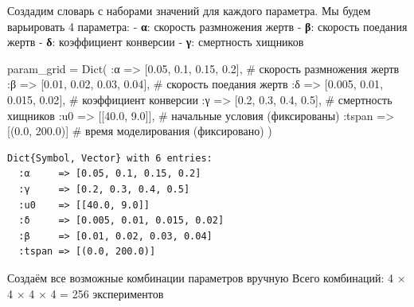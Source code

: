 \documentclass[
  12pt,
  a4paper,
  DIV=11,
  numbers=noendperiod]{scrreprt}
\newenvironment{Shaded}{\begin{snugshade}}{\end{snugshade}}
\newcommand{\CommentTok}[1]{\textcolor[rgb]{0.37,0.37,0.37}{#1}}
\newcommand{\FloatTok}[1]{\textcolor[rgb]{0.68,0.00,0.00}{#1}}
\newcommand{\FunctionTok}[1]{\textcolor[rgb]{0.28,0.35,0.67}{#1}}
\newcommand{\NormalTok}[1]{\textcolor[rgb]{0.00,0.23,0.31}{#1}}
\newcommand{\OperatorTok}[1]{\textcolor[rgb]{0.37,0.37,0.37}{#1}}
\begin{document}
Создадим словарь с наборами значений для каждого параметра. Мы будем
варьировать 4 параметра: - \textbf{α}: скорость размножения жертв -
\textbf{β}: скорость поедания жертв - \textbf{δ}: коэффициент конверсии
- \textbf{γ}: смертность хищников

\begin{Shaded}
\begin{Highlighting}[]
\NormalTok{param\_grid }\OperatorTok{=} \FunctionTok{Dict}\NormalTok{(}
    \OperatorTok{:}\NormalTok{α }\OperatorTok{=\textgreater{}}\NormalTok{ [}\FloatTok{0.05}\NormalTok{, }\FloatTok{0.1}\NormalTok{, }\FloatTok{0.15}\NormalTok{, }\FloatTok{0.2}\NormalTok{],        }\CommentTok{\# скорость размножения жертв}
    \OperatorTok{:}\NormalTok{β }\OperatorTok{=\textgreater{}}\NormalTok{ [}\FloatTok{0.01}\NormalTok{, }\FloatTok{0.02}\NormalTok{, }\FloatTok{0.03}\NormalTok{, }\FloatTok{0.04}\NormalTok{],       }\CommentTok{\# скорость поедания жертв}
    \OperatorTok{:}\NormalTok{δ }\OperatorTok{=\textgreater{}}\NormalTok{ [}\FloatTok{0.005}\NormalTok{, }\FloatTok{0.01}\NormalTok{, }\FloatTok{0.015}\NormalTok{, }\FloatTok{0.02}\NormalTok{],     }\CommentTok{\# коэффициент конверсии}
    \OperatorTok{:}\NormalTok{γ }\OperatorTok{=\textgreater{}}\NormalTok{ [}\FloatTok{0.2}\NormalTok{, }\FloatTok{0.3}\NormalTok{, }\FloatTok{0.4}\NormalTok{, }\FloatTok{0.5}\NormalTok{],           }\CommentTok{\# смертность хищников}
    \OperatorTok{:}\NormalTok{u0 }\OperatorTok{=\textgreater{}}\NormalTok{ [[}\FloatTok{40.0}\NormalTok{, }\FloatTok{9.0}\NormalTok{]],                  }\CommentTok{\# начальные условия (фиксированы)}
    \OperatorTok{:}\NormalTok{tspan }\OperatorTok{=\textgreater{}}\NormalTok{ [(}\FloatTok{0.0}\NormalTok{, }\FloatTok{200.0}\NormalTok{)]               }\CommentTok{\# время моделирования (фиксировано)}
\NormalTok{)}
\end{Highlighting}
\end{Shaded}

\begin{verbatim}
Dict{Symbol, Vector} with 6 entries:
  :α     => [0.05, 0.1, 0.15, 0.2]
  :γ     => [0.2, 0.3, 0.4, 0.5]
  :u0    => [[40.0, 9.0]]
  :δ     => [0.005, 0.01, 0.015, 0.02]
  :β     => [0.01, 0.02, 0.03, 0.04]
  :tspan => [(0.0, 200.0)]
\end{verbatim}

Создаём все возможные комбинации параметров вручную Всего комбинаций: 4
× 4 × 4 × 4 = 256 экспериментов
\end{document}
